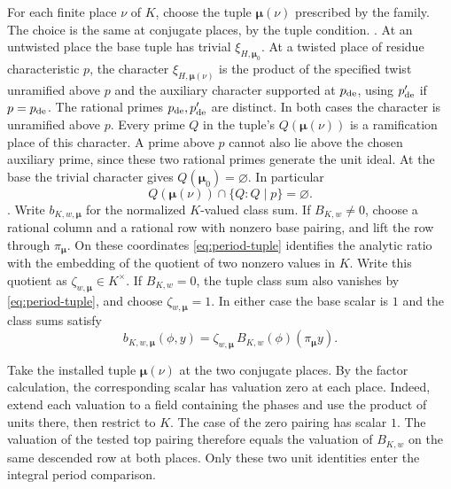 For each finite place \(\nu\) of \(K\), choose the tuple
\(\boldsymbol\mu(\nu)\) prescribed by the family. The choice is the
same at conjugate places, by the tuple condition.
.
At an untwisted place the base tuple has
trivial \(\xi_{H,\boldsymbol\mu_0}\). At a twisted place of residue
characteristic \(p\), the character \(\xi_{H,\boldsymbol\mu(\nu)}\)
is the product of the specified twist unramified above \(p\) and the
auxiliary character supported at \(p_{\rm de}\), using \(p'_{\rm de}\)
if \(p=p_{\rm de}\). The rational primes \(p_{\rm de},p'_{\rm de}\)
are distinct. In both cases the character is unramified above \(p\).
Every prime \(Q\) in the tuple's \(Q(\boldsymbol\mu(\nu))\) is a
ramification place of this character. A prime above \(p\) cannot
also lie above the chosen auxiliary prime, since these two
rational primes generate the unit ideal. At the base the trivial
character gives \(Q(\boldsymbol\mu_0)=\varnothing\).
In particular
\begin{equation}
 \label{eq:period-selected-twist-avoidance}
 Q(\boldsymbol\mu(\nu))\cap\{Q:Q\mid p\}=\varnothing .
\end{equation}
.
Write \(b_{K,w,\boldsymbol\mu}\) for the normalized \(K\)-valued
class sum. If \(B_{K,w}\ne0\), choose a rational column and a
rational row with nonzero base pairing, and lift the row through
\(\pi_{\boldsymbol\mu}\). On these coordinates \eqref{eq:period-tuple}
identifies the analytic ratio with the embedding of the quotient
of two nonzero values in \(K\). Write this quotient as
\(\zeta_{w,\boldsymbol\mu}\in K^\times\).
If \(B_{K,w}=0\), the tuple class sum also vanishes by
\eqref{eq:period-tuple}, and choose \(\zeta_{w,\boldsymbol\mu}=1\).
In either case the base scalar is \(1\) and the class sums satisfy
\[
 b_{K,w,\boldsymbol\mu}(\phi,y)
    =\zeta_{w,\boldsymbol\mu}\,
      B_{K,w}(\phi)(\pi_{\boldsymbol\mu}y).
\]

Take the installed tuple \(\boldsymbol\mu(\nu)\) at the two
conjugate places. By the factor calculation, the corresponding
scalar has valuation zero at each place. Indeed, extend each
valuation to a field containing the phases and use the product
of units there, then restrict to \(K\). The case of the zero
pairing has scalar \(1\). The valuation of the tested top pairing
therefore equals the valuation of \(B_{K,w}\) on the same
descended row at both places. Only these two unit identities
enter the integral period comparison.

